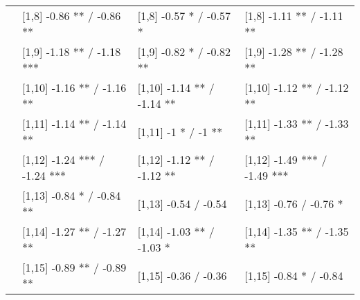 \begin{table}
\begin{tabular}[t]{llll}
\addlinespace
500 & {}[1,8] -0.86 ** / -0.86 ** & {}[1,8] -0.57 * / -0.57 * & {}[1,8] -1.11 ** / -1.11 **\\
 & {}[1,9] -1.18 ** / -1.18 *** & {}[1,9] -0.82 * / -0.82 ** & {}[1,9] -1.28 ** / -1.28 **\\
 & {}[1,10] -1.16 ** / -1.16 ** & {}[1,10] -1.14 ** / -1.14 ** & {}[1,10] -1.12 ** / -1.12 **\\
 & {}[1,11] -1.14 ** / -1.14 ** & {}[1,11] -1 * / -1 ** & {}[1,11] -1.33 ** / -1.33 **\\
 & {}[1,12] -1.24 *** / -1.24 *** & {}[1,12] -1.12 ** / -1.12 ** & {}[1,12] -1.49 *** / -1.49 ***\\
\addlinespace
 & {}[1,13] -0.84 * / -0.84 ** & {}[1,13] -0.54  / -0.54 & {}[1,13] -0.76  / -0.76 *\\
 & {}[1,14] -1.27 ** / -1.27 ** & {}[1,14] -1.03 ** / -1.03 * & {}[1,14] -1.35 ** / -1.35 **\\
 & {}[1,15] -0.89 ** / -0.89 ** & {}[1,15] -0.36  / -0.36 & {}[1,15] -0.84 * / -0.84\\
\bottomrule
\end{tabular}
\end{table}
